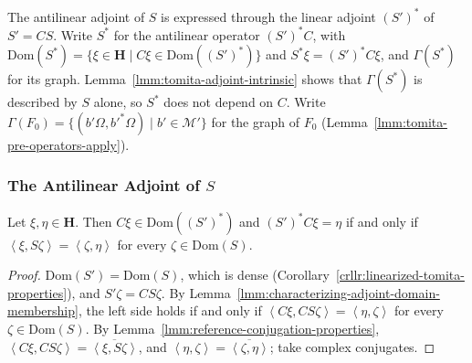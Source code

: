 The antilinear adjoint of $S$ is expressed through the linear adjoint $(S')^*$ of $S' = CS$. Write $S^*$ for the antilinear operator $(S')^*C$, with $\text{Dom}(S^*) = \{ \xi \in \mathbf{H} \mid C\xi \in \text{Dom}((S')^*) \}$ and $S^*\xi = (S')^*C\xi$, and $\Gamma(S^*)$ for its graph. Lemma~\ref{lmm:tomita-adjoint-intrinsic} shows that $\Gamma(S^*)$ is described by $S$ alone, so $S^*$ does not depend on $C$. Write $\Gamma(F_0) = \{ (b'\Omega, b'^*\Omega) \mid b' \in \mathcal{M}' \}$ for the graph of $F_0$ (Lemma~\ref{lmm:tomita-pre-operators-apply}).

\subsubsection{The Antilinear Adjoint of $S$}

\begin{lemma}
    \label{lmm:tomita-adjoint-intrinsic}
    \leanok
    Let $\xi, \eta \in \mathbf{H}$. Then $C\xi \in \text{Dom}((S')^*)$ and $(S')^*C\xi = \eta$ if and only if $\left< \xi, S\zeta \right> = \left< \zeta, \eta \right>$ for every $\zeta \in \text{Dom}(S)$.
\end{lemma}
\begin{proof}
    \leanok
    $\text{Dom}(S') = \text{Dom}(S)$, which is dense (Corollary~\ref{crllr:linearized-tomita-properties}), and $S'\zeta = CS\zeta$. By Lemma~\ref{lmm:characterizing-adjoint-domain-membership}, the left side holds if and only if $\left< C\xi, CS\zeta \right> = \left< \eta, \zeta \right>$ for every $\zeta \in \text{Dom}(S)$. By Lemma~\ref{lmm:reference-conjugation-properties}, $\left< C\xi, CS\zeta \right> = \overline{\left< \xi, S\zeta \right>}$, and $\left< \eta, \zeta \right> = \overline{\left< \zeta, \eta \right>}$; take complex conjugates.
\end{proof}

